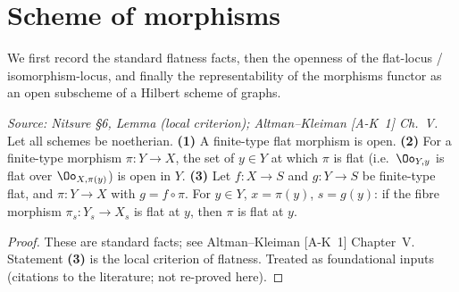 \section{Scheme of morphisms}

We first record the standard flatness facts, then the openness of the
flat-locus / isomorphism-locus, and finally the representability of the
morphisms functor as an open subscheme of a Hilbert scheme of graphs.

\begin{lemma}
  \label{lem:flatness-local-criterion}
  \textit{Source: Nitsure §6, Lemma (local criterion); Altman--Kleiman [A-K~1] Ch.~V.}
  Let all schemes be noetherian. \textbf{(1)} A finite-type flat morphism is open.
  \textbf{(2)} For a finite-type morphism $\pi\colon Y\to X$, the set of $y\in Y$
  at which $\pi$ is flat (i.e.\ $\Oo_{Y,y}$ is flat over $\Oo_{X,\pi(y)}$) is open
  in $Y$. \textbf{(3)} Let $f\colon X\to S$ and $g\colon Y\to S$ be finite-type
  flat, and $\pi\colon Y\to X$ with $g = f\circ\pi$. For $y\in Y$, $x = \pi(y)$,
  $s = g(y)$: if the fibre morphism $\pi_s\colon Y_s\to X_s$ is flat at $y$, then
  $\pi$ is flat at $y$.
\end{lemma}

\begin{proof}
  These are standard facts; see Altman--Kleiman [A-K~1] Chapter~V. Statement
  \textbf{(3)} is the local criterion of flatness. Treated as foundational
  inputs (citations to the literature; not re-proved here).
\end{proof}

